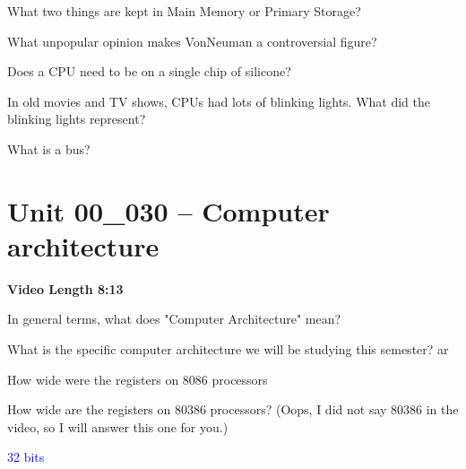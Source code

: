 \documentclass[letterpaper,12pt]{exam}
\newcommand{\unit}{Unit 00}
\begin{document}
\begin{questions}
 \begin{samepage}
     \question What two things are kept in Main Memory or Primary Storage?
     \vspace{5mm}
 \end{samepage}
 \par
 \begin{samepage}
     \question What unpopular opinion makes VonNeuman a controversial figure?
     \vspace{5mm}
 \end{samepage}
 \par
  \begin{samepage}
      \question Does a CPU need to be on a single chip of silicone?
      \vspace{5mm}
  \end{samepage}
  \par
   \begin{samepage}
       \question In old movies and TV shows, CPUs had lots of blinking lights.  What did the blinking lights represent?
       \vspace{5mm}
   \end{samepage}
   \par
   \begin{samepage}
       \question What is a bus?
       \vspace{5mm}
   \end{samepage}
   \par
\section*{\unit\_030 -- Computer architecture}
\par{\selectfont\textbf{Video Length 8:13}}
\begin{samepage}
    \question In general terms, what does "Computer Architecture" mean?
    \vspace{5mm}
\end{samepage}
\begin{samepage}
    \question What is the specific computer architecture we will be studying this semester?
    \vspace{5mm}
ar
\end{samepage}
\begin{samepage}
    \question How wide were the registers on 8086 processors
    \vspace{5mm}
\end{samepage}
\par
\begin{samepage}
    \question How wide are the registers on 80386 processors? (Oops, I did not say 80386 in the video, so I will answer this one for you.)
    \par  
    \textcolor{blue}{\LARGE 32 bits}
    

\end{samepage}
\end{questions}
\end{document}
